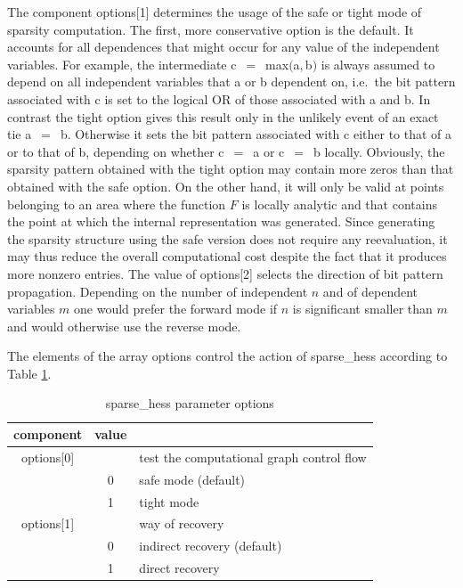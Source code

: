 \documentclass[11pt,twoside]{article}
\begin{document}
The component {\sf options[1]} determines
the usage of the safe or tight mode of sparsity computation.
The first, more conservative option is the default. It accounts for all 
dependences that might occur for any value of the
independent variables. For example, the intermediate 
{\sf c}~$=$~{\sf max}$(${\sf a}$,${\sf b}$)$ is
always assumed to depend on all independent variables that {\sf a} or {\sf b}
dependent on, i.e.\ the bit pattern associated with {\sf c} is set to the
logical {\sf OR} of those associated with {\sf a} and {\sf b}. 
In contrast
the tight option gives this result only in the unlikely event of an exact
tie {\sf a}~$=$~{\sf b}. Otherwise it sets the bit pattern
associated with {\sf c} either to that of {\sf a} or to that of {\sf b},
depending on whether {\sf c}~$=$~{\sf a} or {\sf c}~$=$~{\sf b} locally.
Obviously, the sparsity pattern obtained with the tight option may contain
more zeros than that obtained with the safe option. On the other hand, it
will only be valid at points belonging to an area where the function $F$ is locally
analytic and that contains the point at which the internal representation was
generated. Since generating the sparsity structure using the safe version does not
require any reevaluation, it may thus reduce the overall computational cost 
despite the fact that it produces more nonzero entries. 
The value of {\sf options[2]} selects the direction of bit pattern propagation.
Depending on the number of independent $n$ and of dependent variables $m$ 
one would prefer the forward mode if $n$ is significant smaller than $m$ and
would otherwise use the reverse mode.

 The elements of the array {\sf options} control the action of 
{\sf sparse\_hess} according to Table \ref{options_sparse_hess}.
\begin{table}[h]
\center
\begin{tabular}{|c|c|l|} \hline
component & value &  \\ \hline
{\sf options[0]} &    &  test the computational graph control flow \\
                 & 0  &  safe mode (default) \\
                 & 1  &  tight mode \\ \hline
{\sf options[1]} &    &  way of recovery \\
                 & 0  &  indirect recovery (default) \\
                 & 1  &  direct recovery \\ \hline
\end{tabular}
\caption{ {\sf sparse\_hess} parameter {\sf options}\label{options_sparse_hess}}
\end{table}           
\end{document}
